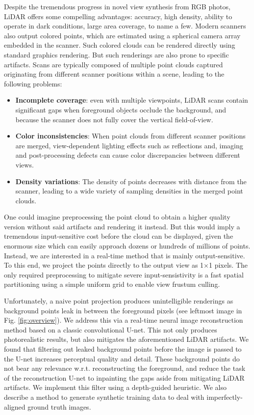 \documentclass[twocolumn]{article}
\begin{document}
Despite the tremendous progress in novel view synthesis from RGB photos, LiDAR offers some compelling advantages: accuracy, high density, ability to operate in dark conditions, large area coverage, to name a few. Modern scanners also output colored points, which are estimated using a spherical camera array embedded in the scanner. Such colored clouds can be rendered directly using standard graphics rendering. But such renderings are also prone to specific artifacts. Scans are typically composed of multiple point clouds captured originating from different scanner positions within a scene, leading to the following problems:
\begin{itemize}
   
    \item \textbf{Incomplete coverage}: even with multiple viewpoints, LiDAR scans contain significant gaps when foreground objects occlude the background, and because the scanner does not fully cover the vertical field-of-view.
    \item \textbf{Color inconsistencies}: When point clouds from different scanner positions are merged, view-dependent lighting effects such as reflections and, imaging and post-processing defects can cause color discrepancies between different views. 
    \item \textbf{Density variations}: The density of points decreases with distance from the scanner, leading to a wide variety of sampling densities in the merged point clouds.
\end{itemize}

One could imagine preprocessing the point cloud to obtain a higher quality version without said artifacts and rendering it instead. But this would imply a tremendous input-sensitive cost before the cloud can be displayed, given the enormous size which can easily approach dozens or hundreds of millions of points. Instead, we are interested in a real-time method that is mainly output-sensitive. To this end, we project the points directly to the output view as 1$\times$1 pixels. The only required preprocessing to mitigate severe input-sensistivity is a fast spatial partitioning using a simple uniform grid to enable view frustum culling.

Unfortunately, a naive point projection produces unintelligible renderings as background points leak in between the foreground pixels (see leftmost image in Fig. \ref{fig:overview}). We address this via a real-time neural image reconstruction method based on a classic convolutional U-net. This not only produces photorealistic results, but also mitigates the aforementioned LiDAR artifacts. We found that filtering out leaked background points before the image is passed to the U-net increases perceptual quality and detail. These background points do not bear any relevance w.r.t. reconstructing the foreground, and reduce the task of the reconstruction U-net to inpainting the gaps aside from mitigating LiDAR artifacts. We implement this filter using a depth-guided heuristic. We also describe a method to generate synthetic training data to deal with imperfectly-aligned ground truth images.
\end{document}
